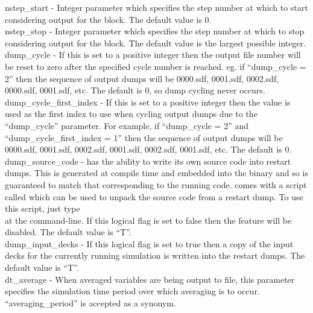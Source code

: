 {\emphtext nstep\_start} - Integer parameter which specifies the
  step number at which to start considering output for the block.
  The default value is 0.\\

{\emphtext nstep\_stop} - Integer parameter which specifies the
  step number at which to stop considering output for the block.
  The default value is the largest possible integer.\\

{\emphtext dump\_cycle} - If this is set to a positive integer then the
  output file number will be reset to zero after the specified cycle number
  is reached. eg. if ``dump\_cycle = 2'' then the sequence of output dumps
  will be 0000.sdf, 0001.sdf, 0002.sdf, 0000.sdf, 0001.sdf, etc.
  The default is 0, so dump cycling never occurs.\\

{\emphtext dump\_cycle\_first\_index} - If this is set to a positive integer
  then the value is used as the first index to use when cycling output dumps
  due to the ``dump\_cycle'' parameter. For example, if ``dump\_cycle = 2''
  and ``dump\_cycle\_first\_index = 1'' then the sequence of output dumps
  will be 0000.sdf, 0001.sdf, 0002.sdf, 0001.sdf, 0002.sdf, 0001.sdf, etc.
  The default is 0.\\

{\emphtext dump\_source\_code} - {\EPOCH} has the ability to write its own
source code into restart dumps. This is generated at compile time and embedded
into the binary and so is guaranteed to match that corresponding to the running
code. {\EPOCH} comes with a script called
 which can be used to unpack the
source code from a restart dump. To use this script, just type
\indent{}\\
at the command-line.
If this logical flag is set to false then
the feature will be disabled. The default value is ``T''.\\

{\emphtext dump\_input\_decks} - If this logical flag is set to true then
a copy of the input decks for the currently running simulation is written
into the restart dumps. The default value is ``T''.\\

{\emphtext dt\_average} - When averaged variables are being output to
file, this parameter specifies the simulation time period over which
averaging is to occur. ``averaging\_period'' is accepted as a synonym.\\

